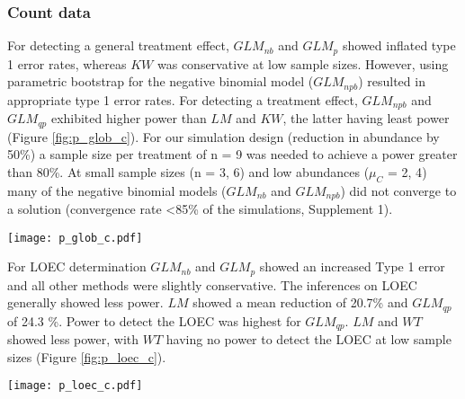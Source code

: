 \documentclass[twocolumn, natbib]{svjour3}
\begin{document}
\subsubsection{Count data}
For detecting a general treatment effect, $GLM_{nb}$ and $GLM_{p}$ showed inflated type 1 error rates, whereas $KW$ was conservative at low sample sizes.
However, using parametric bootstrap for the negative binomial model ($GLM_{npb}$) resulted in appropriate type 1 error rates.
For detecting a treatment effect, $GLM_{npb}$ and $GLM_{qp}$ exhibited higher power than $LM$ and $KW$, the latter having least power (Figure \ref{fig:p_glob_c}).
For our simulation design (reduction in abundance by 50\%) a sample size per treatment of n = 9 was needed to achieve a power greater than 80\%.
At small sample sizes (n = {3, 6}) and low abundances ($\mu_C$ = {2, 4}) many of the negative binomial models ($GLM_{nb}$ and $GLM_{npb}$) did not converge to a solution (convergence rate \textless 85\% of the simulations, Supplement 1). 

\begin{figure*}
  \centering
  \texttt{[image: p\_glob\_c.pdf]}
  \caption{Count data simulations: Type 1 error (top) and Power (bottom) for the test of a treatment effect.
  Only type 1 errors \textless 25\% are displayed. 
  $GLM_p$ showed type 1 errors \textgreater 20\% in all simulation scenarios.
  Power levels for models with inflated type I error are shown for completeness.
  For n = \{3, 6\} and $\mu_C$ = \{2, 4\} less than 85\% of $GLM_{nb}$ and $GLM_{npb}$ models did converge.
  Dashed horizontal line denotes the nominal Type 1 error rate at $\alpha = 0.05$.
  }
  \label{fig:p_glob_c}
\end{figure*}

For LOEC determination $GLM_{nb}$ and $GLM_{p}$ showed an increased Type 1 error and all other methods were slightly conservative.
The inferences on LOEC generally showed less power.
$LM$ showed a mean reduction of 20.7\% and $GLM_{qp}$ of 24.3 \%.
Power to detect the LOEC was highest for $GLM_{qp}$. 
$LM$ and $WT$ showed less power, with $WT$ having no power to detect the LOEC at low sample sizes (Figure \ref{fig:p_loec_c}).

\begin{figure*}
  \centering
  \texttt{[image: p\_loec\_c.pdf]}
  \caption{Count data simulations: Type 1 error (top) and Power (bottom) for determination of LOEC.
  For clarity only type 1 errors \textless 25\% are displayed.
  Power levels for models with inflated type I error are shown for completeness.
  For n = \{3, 6\} and $\mu_C$ = \{2, 4\} less than 85\% of $GLM_{nb}$ models did converge.
  Dashed horizontal line denotes the nominal Type 1 error rate at $\alpha = 0.05$.
  }
  \label{fig:p_loec_c}
\end{figure*}
\end{document}
